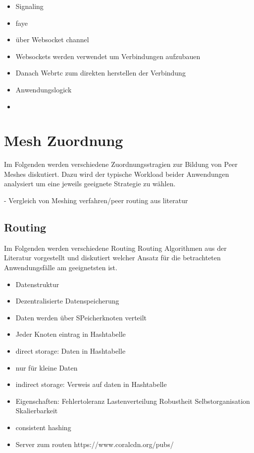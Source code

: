 \begin{itemize}
	\item Signaling
	\item faye
	\item über Websocket channel
	\item Websockets werden verwendet um Verbindungen aufzubauen
	\item Danach Webrtc zum direkten herstellen der Verbindung
	\item Anwendungslogick
	\item 
\end{itemize}

\section{Mesh Zuordnung}
Im Folgenden werden verschiedene Zuordnungsstragien zur Bildung von Peer Meshes diskutiert. Dazu wird der typische Workload beider Anwendungen analysiert um eine jeweils geeignete Strategie zu wählen. 

- Vergleich von Meshing verfahren/peer routing aus literatur
\subsection{Routing}
Im Folgenden werden verschiedene Routing \pTp Routing Algorithmen aus der Literatur vorgestellt und diskutiert welcher Ansatz für die betrachteten Anwendungsfälle am geeignetsten ist.

\begin{itemize}
	\item Datenstruktur
	\item  Dezentralisierte Datenspeicherung
	\item Daten werden über SPeicherknoten verteilt
	\item Jeder Knoten eintrag in Hashtabelle
	\item direct storage: Daten in Hashtabelle
	\item nur für kleine Daten
	\item indirect storage: Verweis auf daten in Hashtabelle
	\item Eigenschaften:
Fehlertoleranz
Lastenverteilung
Robustheit
Selbstorganisation
Skalierbarkeit
	\item consistent hashing
	\item Server zum routen
https://www.coralcdn.org/pubs/
\end{itemize}






